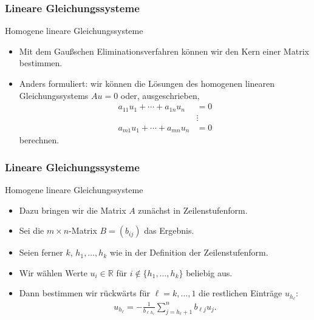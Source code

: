 \documentclass{beamer}
\newcommand\RR{\mathbb R}
\renewcommand{\ae}{\"a}
\renewcommand{\oe}{\"o}
\newcommand{\ue}{\"u}
\newcommand{\mytitle}{Lineare Gleichungssysteme}
\begin{document}
\begin{frame}\frametitle{\mytitle}
	\begin{block}{Homogene lineare Gleichungssysteme}
	\begin{itemize}
		\item Mit dem Gau\ss schen Eliminationsverfahren k\oe nnen wir den Kern einer Matrix bestimmen.
		\item Anders formuliert: wir k\oe nnen die L\oe sungen des homogenen linearen Gleichungssystems $Au=0$ oder, ausgeschrieben,
			\begin{align*}
				a_{11}u_1+\cdots+a_{1n}u_n&=0\\
										  &\vdots\\
				a_{m1}u_1+\cdots+a_{mn}u_n&=0
			\end{align*}
			berechnen.
	\end{itemize}
	\end{block}
\end{frame}

\begin{frame}\frametitle{\mytitle}
	\begin{block}{Homogene lineare Gleichungssysteme}
	\begin{itemize}
		\item Dazu bringen wir die Matrix $A$ zun\ae chst in Zeilenstufenform.
		\item Sei die $m\times n$-Matrix $B=(b_{ij})$ das Ergebnis.
		\item Seien ferner $k$, $h_1,\ldots,h_k$ wie in der Definition der Zeilenstufenform.
		\item Wir w\ae hlen Werte $u_i\in\RR$ f\ue r $i\not\in\{h_1,\ldots,h_k\}$ beliebig aus.
		\item Dann bestimmen wir r\ue ckw\ae rts f\ue r $\ell=k,\ldots,1$ die restlichen Eintr\ae ge $u_{h_\ell}$:
			\begin{align*}
				u_{h_\ell}=-\frac{1}{b_{\ell\, h_\ell}}\sum^n_{j=h_{\ell}+1}b_{\ell j}u_j.
			\end{align*}
	\end{itemize}
	\end{block}
\end{frame}
\end{document}
